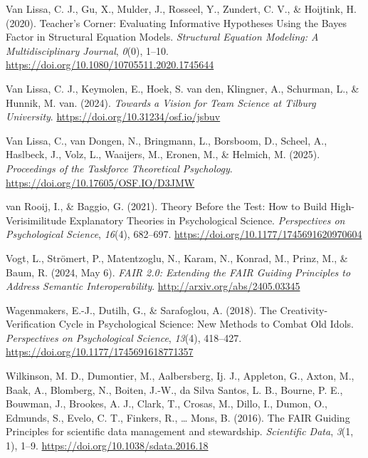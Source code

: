\documentclass[man]{apa7}
\newlength{\cslhangindent}
\newenvironment{CSLReferences}[2] %
 {\begin{list}{}{%
  \setlength{\itemindent}{0pt}
  \setlength{\leftmargin}{0pt}
  \setlength{\parsep}{0pt}
  \ifodd #1
   \setlength{\leftmargin}{\cslhangindent}
   \setlength{\itemindent}{-1\cslhangindent}
  \fi
  \setlength{\itemsep}{#2\baselineskip}}}
 {\end{list}}
\begin{document}
\begin{CSLReferences}{1}{0}
Van Lissa, C. J., Gu, X., Mulder, J., Rosseel, Y., Zundert, C. V., \& Hoijtink, H. (2020). Teacher's {Corner}: {Evaluating Informative Hypotheses Using} the {Bayes Factor} in {Structural Equation Models}. \emph{Structural Equation Modeling: A Multidisciplinary Journal}, \emph{0}(0), 1--10. \url{https://doi.org/10.1080/10705511.2020.1745644}

Van Lissa, C. J., Keymolen, E., Hoek, S. van den, Klingner, A., Schurman, L., \& Hunnik, M. van. (2024). \emph{Towards a {Vision} for {Team Science} at {Tilburg University}}. \url{https://doi.org/10.31234/osf.io/jsbuv}

Van Lissa, C., van Dongen, N., Bringmann, L., Borsboom, D., Scheel, A., Haslbeck, J., Volz, L., Waaijers, M., Eronen, M., \& Helmich, M. (2025). \emph{Proceedings of the {Taskforce Theoretical Psychology}}. \url{https://doi.org/10.17605/OSF.IO/D3JMW}

van Rooij, I., \& Baggio, G. (2021). Theory {Before} the {Test}: {How} to {Build High-Verisimilitude Explanatory Theories} in {Psychological Science}. \emph{Perspectives on Psychological Science}, \emph{16}(4), 682--697. \url{https://doi.org/10.1177/1745691620970604}

Vogt, L., Strömert, P., Matentzoglu, N., Karam, N., Konrad, M., Prinz, M., \& Baum, R. (2024, May 6). \emph{{FAIR} 2.0: {Extending} the {FAIR Guiding Principles} to {Address Semantic Interoperability}}. \url{http://arxiv.org/abs/2405.03345}

Wagenmakers, E.-J., Dutilh, G., \& Sarafoglou, A. (2018). The {Creativity-Verification Cycle} in {Psychological Science}: {New Methods} to {Combat Old Idols}. \emph{Perspectives on Psychological Science}, \emph{13}(4), 418--427. \url{https://doi.org/10.1177/1745691618771357}

Wilkinson, M. D., Dumontier, M., Aalbersberg, Ij. J., Appleton, G., Axton, M., Baak, A., Blomberg, N., Boiten, J.-W., da Silva Santos, L. B., Bourne, P. E., Bouwman, J., Brookes, A. J., Clark, T., Crosas, M., Dillo, I., Dumon, O., Edmunds, S., Evelo, C. T., Finkers, R., \ldots{} Mons, B. (2016). The {FAIR Guiding Principles} for scientific data management and stewardship. \emph{Scientific Data}, \emph{3}(1, 1), 1--9. \url{https://doi.org/10.1038/sdata.2016.18}


\end{CSLReferences}
\end{document}

